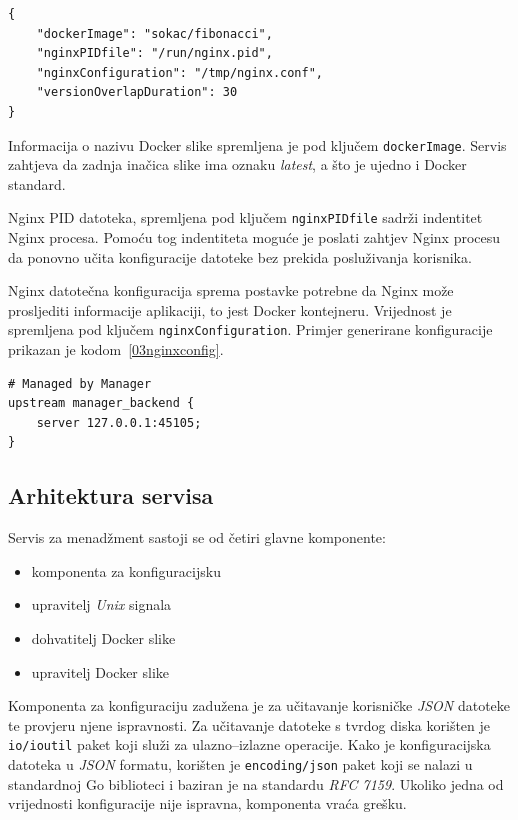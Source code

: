 \begin{lstlisting}[float=h]
{
    "dockerImage": "sokac/fibonacci",
    "nginxPIDfile": "/run/nginx.pid",
    "nginxConfiguration": "/tmp/nginx.conf",
    "versionOverlapDuration": 30
}

\end{lstlisting}

Informacija o nazivu Docker slike spremljena je pod ključem \texttt{dockerImage}. Servis
zahtjeva da zadnja inačica slike ima oznaku \textit{latest}, a što je ujedno i Docker standard.

Nginx PID datoteka, spremljena pod ključem \texttt{nginxPIDfile} sadrži indentitet Nginx procesa.
Pomoću tog indentiteta moguće je poslati zahtjev Nginx procesu da ponovno učita konfiguracije
datoteke bez prekida posluživanja korisnika.

Nginx datotečna konfiguracija sprema postavke potrebne da Nginx može prosljediti informacije
aplikaciji, to jest Docker kontejneru. Vrijednost je spremljena pod ključem
\texttt{nginxConfiguration}. Primjer generirane konfiguracije prikazan je
kodom~\ref{03nginxconfig}.

\begin{lstlisting}[float=h]
# Managed by Manager
upstream manager_backend {
    server 127.0.0.1:45105;
}
\end{lstlisting}

\subsection{Arhitektura servisa}
Servis za menadžment sastoji se od četiri glavne komponente:
\begin{itemize}
    \item komponenta za konfiguracijsku
    \item upravitelj \textit{Unix} signala
    \item dohvatitelj Docker slike
    \item upravitelj Docker slike
\end{itemize}

Komponenta za konfiguraciju zadužena je za učitavanje korisničke \textit{JSON} datoteke te provjeru
njene ispravnosti. Za učitavanje datoteke s tvrdog diska korišten je \texttt{io/ioutil} paket koji
služi za ulazno--izlazne operacije. Kako je konfiguracijska datoteka u \textit{JSON} formatu,
korišten je \texttt{encoding/json} paket koji se nalazi u standardnoj Go biblioteci i baziran je na
standardu \textit{RFC 7159}. Ukoliko jedna od vrijednosti konfiguracije nije ispravna, komponenta
vraća grešku.

